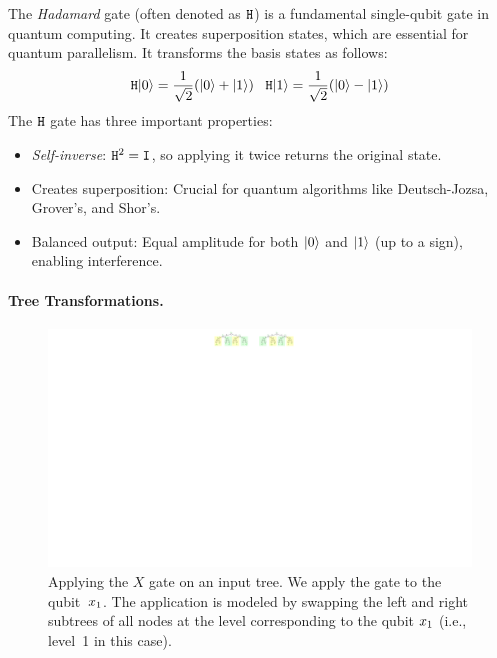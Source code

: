 The {\it Hadamard} gate (often denoted as $\mathtt{H}$) is a fundamental single-qubit gate in quantum computing. 
%
It creates superposition states, which are essential for quantum parallelism.
%
It transforms the basis states as follows:
\[
\mathtt{H}|0\rangle=\frac{1}{\sqrt2}(|0\rangle+|1\rangle)
\;\;\;
\mathtt{H}|1\rangle=\frac{1}{\sqrt2}(|0\rangle-|1\rangle)
\]
%
The $\mathtt{H}$ gate has three important properties:
\begin{itemize}
\item
{\it Self-inverse}: $\mathtt{H}^2 = \mathtt{I}$, so applying it twice returns the original state.
\item
Creates superposition: Crucial for quantum algorithms like Deutsch-Jozsa, Grover’s, and Shor’s.
\item
Balanced output: Equal amplitude for both $|0\rangle$ and $|1\rangle$  (up to a sign), enabling interference.
\end{itemize}

\paragraph{Tree Transformations.}

\begin{figure}[ht] 
    \centering
    \includegraphics[scale=0.9]{Figures/Trees/ApplyNOT} 
    \caption{Applying the $X$ gate on an input tree. 
    We apply the gate to the qubit~$x_1$.
    The application is modeled by swapping the left and right subtrees of all nodes at the level corresponding to the qubit $x_1$ (i.e., level~1 in this case).
    }
    \label{apply:not:fig}
\end{figure}

